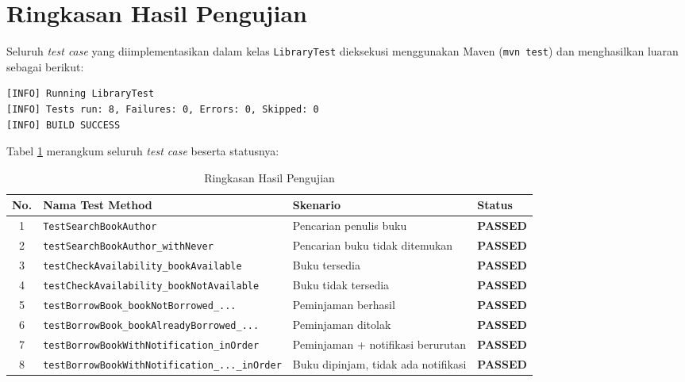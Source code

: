 \documentclass[12pt,a4paper]{article}
\begin{document}
\section{Ringkasan Hasil Pengujian}

Seluruh \textit{test case} yang diimplementasikan dalam kelas \texttt{LibraryTest}
dieksekusi menggunakan Maven (\texttt{mvn test}) dan menghasilkan luaran sebagai
berikut:

\begin{verbatim}
[INFO] Running LibraryTest
[INFO] Tests run: 8, Failures: 0, Errors: 0, Skipped: 0
[INFO] BUILD SUCCESS
\end{verbatim}

Tabel \ref{tab:test-summary} merangkum seluruh \textit{test case} beserta
statusnya:

\begin{table}[H]
\centering
\caption{Ringkasan Hasil Pengujian}
\label{tab:test-summary}
\begin{tabular}{@{}clll@{}}
\toprule
\textbf{No.} & \textbf{Nama Test Method} & \textbf{Skenario} & \textbf{Status} \\
\midrule
1 & \texttt{TestSearchBookAuthor} &
    Pencarian penulis buku & \textcolor{codegreen}{\textbf{PASSED}} \\
2 & \texttt{testSearchBookAuthor\_withNever} &
    Pencarian buku tidak ditemukan & \textcolor{codegreen}{\textbf{PASSED}} \\
3 & \texttt{testCheckAvailability\_bookAvailable} &
    Buku tersedia & \textcolor{codegreen}{\textbf{PASSED}} \\
4 & \texttt{testCheckAvailability\_bookNotAvailable} &
    Buku tidak tersedia & \textcolor{codegreen}{\textbf{PASSED}} \\
5 & \texttt{testBorrowBook\_bookNotBorrowed\_...} &
    Peminjaman berhasil & \textcolor{codegreen}{\textbf{PASSED}} \\
6 & \texttt{testBorrowBook\_bookAlreadyBorrowed\_...} &
    Peminjaman ditolak & \textcolor{codegreen}{\textbf{PASSED}} \\
7 & \texttt{testBorrowBookWithNotification\_inOrder} &
    Peminjaman + notifikasi berurutan & \textcolor{codegreen}{\textbf{PASSED}} \\
8 & \texttt{testBorrowBookWithNotification\_...\_inOrder} &
    Buku dipinjam, tidak ada notifikasi & \textcolor{codegreen}{\textbf{PASSED}} \\
\bottomrule
\end{tabular}
\end{table}
\end{document}

